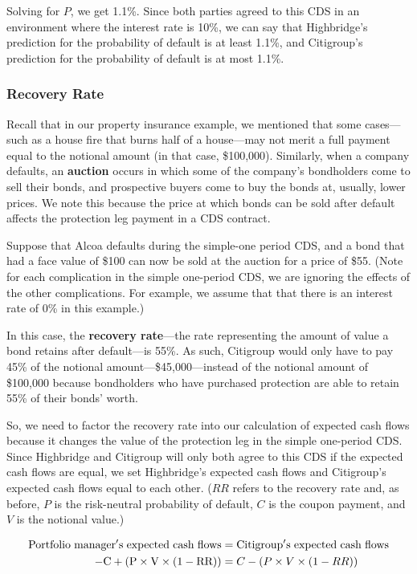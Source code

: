 \documentclass{jss}
\begin{document}
Solving for $P$, we get 1.1\%. Since both parties agreed to this CDS in an environment where the interest rate is 10\%, we can say that Highbridge's prediction for the probability of default is at least 1.1\%, and Citigroup's prediction for the probability of default is at most 1.1\%. 

\subsubsection{Recovery Rate}

Recall that in our property insurance example, we mentioned that some cases---such as a house fire that burns half of a house---may not merit a full payment equal to the notional amount (in that case, \$100,000). Similarly, when a company defaults, an \textbf{auction} occurs in which some of the company's bondholders come to sell their bonds, and prospective buyers come to buy the bonds at, usually, lower prices. We note this because the price at which bonds can be sold after default affects the protection leg payment in a CDS contract.

Suppose that Alcoa defaults during the simple-one period CDS, and a bond that had a face value of \$100 can now be sold at the auction for a price of \$55. (Note for each complication in the simple one-period CDS, we are ignoring the effects of the other complications. For example, we assume that that there is an interest rate of 0\% in this example.)

In this case, the \textbf{recovery rate}---the rate representing the amount of value a bond retains after default---is 55\%. As such, Citigroup would only have to pay 45\% of the notional amount---\$45,000---instead of the notional amount of \$100,000 because bondholders who have purchased protection are able to retain 55\% of their bonds' worth. 

So, we need to factor the recovery rate into our calculation of expected cash flows because it changes the value of the protection leg in the simple one-period CDS. Since Highbridge and Citigroup will only both agree to this CDS if the expected cash flows are equal, we set Highbridge's expected cash flows and Citigroup's expected cash flows equal to each other. ($RR$ refers to the recovery rate and, as before, $P$ is the risk-neutral probability of default, $C$ is the coupon payment, and $V$ is the notional value.)

\label{eqn:recovery}
\begin{align}
  \rm Portfolio\hspace{3pt}manager's\hspace{3pt}expected\hspace{3pt}cash\hspace{3pt}flows &= \rm Citigroup's\hspace{3pt}expected\hspace{3pt}cash\hspace{3pt}flows \\
  \rm - C + (P \times V \times (1 - RR)) &= C - (P \times V \times (1 - RR))
\end{align}
\end{document}
